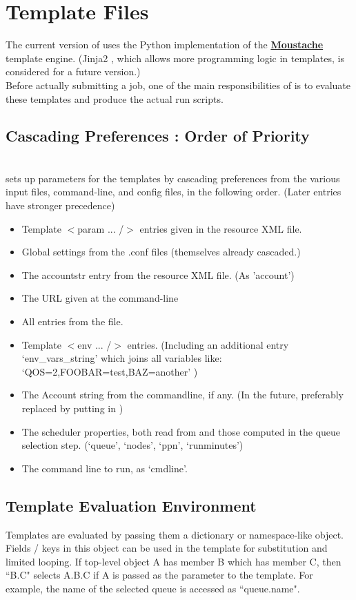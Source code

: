 \section{Template Files\label{templatefile}}

The current version of \theprog uses the Python implementation of the \href{http://mustache.github.io/}{{\bf Moustache}} template engine. (Jinja2 , which allows more programming logic in templates, is considered for a future version.)\\
Before actually submitting a job, one of the main responsibilities of \theprog is to evaluate these templates and produce the actual run scripts.

\subsection{Cascading Preferences : Order of Priority} \hfill \\
\theprog sets up parameters for the templates by cascading preferences from the various input files, command-line, and config files, in the following order. (Later entries have stronger precedence)

\begin{itemize}
	\item Template $<$param ... /$>$ entries given in the resource XML file.
	\item Global settings from the .conf files (themselves already cascaded.)
	\item The accountstr entry from the resource XML file. (As 'account')
	\item The URL given at the command-line
	\item All entries from the  file.
	\item Template $<$env ... /$>$ entries. (Including an additional entry `env\_vars\_string' which joins all variables like: `QOS=2,FOOBAR=test,BAZ=another' )
	\item The Account string from the commandline, if any. (In the future, preferably replaced by putting in )
	\item The scheduler properties, both read from  and those computed in the queue selection step. (`queue', `nodes', `ppn', `runminutes')
	\item The command line to run, as `cmdline'.
\end{itemize}

\subsection{Template Evaluation Environment}
Templates are evaluated by passing them a dictionary or namespace-like object. Fields / keys in this object can be used in the template for substitution and limited looping.
If top-level object A has member B which has member C, then ``B.C" selects A.B.C if A is passed as the parameter to the template.
For example, the name of the selected queue is accessed as ``queue.name".


